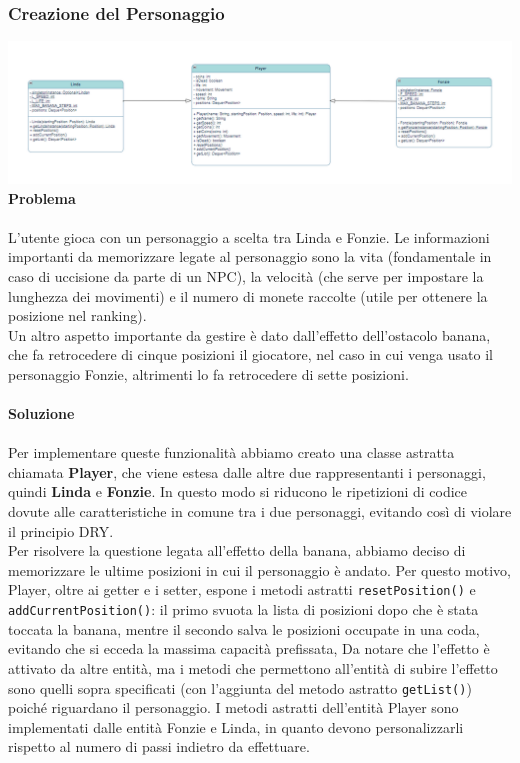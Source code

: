 \documentclass[12pt, letterpaper]{article}
\begin{document}
        \subsubsection{Creazione del Personaggio}
            \includegraphics[width=1\textwidth]{player.png}
            \\
            \textbf{Problema}
            \\ \\
            L'utente gioca con un personaggio a scelta tra Linda e Fonzie. Le informazioni importanti da memorizzare legate al personaggio sono la vita (fondamentale in caso di uccisione da parte di un NPC), la velocità (che serve per impostare la lunghezza dei movimenti) e il numero di monete raccolte (utile per ottenere la posizione nel ranking). \\
            Un altro aspetto importante da gestire è dato dall'effetto dell'ostacolo banana, che fa retrocedere di cinque posizioni il giocatore, nel caso in cui venga usato il personaggio Fonzie, altrimenti lo fa retrocedere di sette posizioni.
            \\ \\
            \textbf{Soluzione}
            \\ \\
            Per implementare queste funzionalità abbiamo creato una classe astratta chiamata \textbf{Player}, che viene estesa dalle altre due rappresentanti i personaggi, quindi \textbf{Linda} e \textbf{Fonzie}. In questo modo si riducono le ripetizioni di codice dovute alle caratteristiche in comune tra i due personaggi, evitando così di violare il principio DRY.\\
            Per risolvere la questione legata all'effetto della banana, abbiamo deciso di memorizzare le ultime posizioni in cui il personaggio è andato. Per questo motivo, Player, oltre ai getter e i setter, espone i metodi astratti \verb|resetPosition()| e \verb|addCurrentPosition()|: il primo svuota la lista di posizioni dopo che è stata toccata la banana, mentre il secondo salva le posizioni occupate in una coda,  evitando che si ecceda la massima capacità prefissata, Da notare che l'effetto è attivato da altre entità, ma i metodi che permettono all'entità di subire l'effetto sono quelli sopra specificati (con l'aggiunta del metodo astratto \verb|getList()|) poiché riguardano il personaggio. I metodi astratti dell'entità Player sono implementati dalle entità Fonzie e Linda, in quanto devono personalizzarli rispetto al numero di passi indietro da effettuare. 
\end{document}
